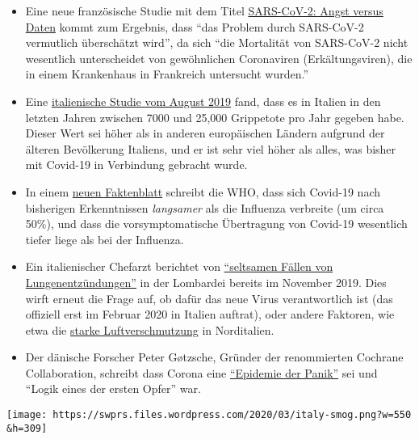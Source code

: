 \begin{itemize}
\tightlist
\item
  Eine neue französische Studie mit dem Titel
  \href{https://www.sciencedirect.com/science/article/abs/pii/S0924857920300972}{SARS-CoV-2:
  Angst versus Daten} kommt zum Ergebnis, dass ``das Problem durch
  SARS-CoV-2 vermutlich überschätzt wird'', da sich ``die Mortalität von
  SARS-CoV-2 nicht wesentlich unterscheidet von gewöhnlichen Coronaviren
  (Erkältungsviren), die in einem Krankenhaus in Frankreich untersucht
  wurden.''
\item
  Eine
  \href{https://www.ijidonline.com/article/S1201-9712(19)30328-5/fulltext}{italienische
  Studie vom August 2019} fand, dass es in Italien in den letzten Jahren
  zwischen 7000 und 25,000 Grippetote pro Jahr gegeben habe. Dieser Wert
  sei höher als in anderen europäischen Ländern aufgrund der älteren
  Bevölkerung Italiens, und er ist sehr viel höher als alles, was bisher
  mit Covid-19 in Verbindung gebracht wurde.
\item
  In einem
  \href{https://www.who.int/news-room/q-a-detail/q-a-similarities-and-differences-covid-19-and-influenza}{neuen
  Faktenblatt} schreibt die WHO, dass sich Covid-19 nach bisherigen
  Erkenntnissen \emph{langsamer} als die Influenza verbreite (um circa
  50\%), und dass die vorsymptomatische Übertragung von Covid-19
  wesentlich tiefer liege als bei der Influenza.
\item
  Ein italienischer Chefarzt berichtet von
  \href{https://www.scmp.com/news/china/society/article/3076334/coronavirus-strange-pneumonia-seen-lombardy-november-leading}{``seltsamen
  Fällen von Lungenentzündungen''} in der Lombardei bereits im November
  2019. Dies wirft erneut die Frage auf, ob dafür das neue Virus
  verantwortlich ist (das offiziell erst im Februar 2020 in Italien
  auftrat), oder andere Faktoren, wie etwa die
  \href{https://www.thelocal.it/20170131/our-lungs-are-breaking-smog-levels-way-above-safe-limits-in-northern-italy}{starke
  Luftverschmutzung} in Norditalien.
\item
  Der dänische Forscher Peter Gøtzsche, Gründer der renommierten
  Cochrane Collaboration, schreibt dass Corona eine
  \href{https://www.deadlymedicines.dk/corona-an-epidemic-of-mass-panic/}{``Epidemie
  der Panik''} sei und ``Logik eines der ersten Opfer'' war.
\end{itemize}

\texttt{[image: https://swprs.files.wordpress.com/2020/03/italy-smog.png?w=550\\\&h=309]}


